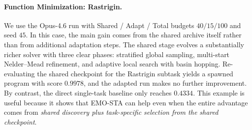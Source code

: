 \paragraph{Function Minimization: Rastrigin.}
We use the Opus-4.6 run with Shared / Adapt / Total budgets $40/15/100$ and seed $45$. In this case, the main gain comes from the shared archive itself rather than from additional adaptation steps. The shared stage evolves a substantially richer solver with three clear phases: stratified global sampling, multi-start Nelder--Mead refinement, and adaptive local search with basin hopping. Re-evaluating the shared checkpoint for the Rastrigin subtask yields a spawned program with score $0.9978$, and the adapted run makes no further improvement. By contrast, the direct single-task baseline only reaches $0.4334$. This example is useful because it shows that EMO-STA can help even when the entire advantage comes from \emph{shared discovery plus task-specific selection from the shared checkpoint}.

